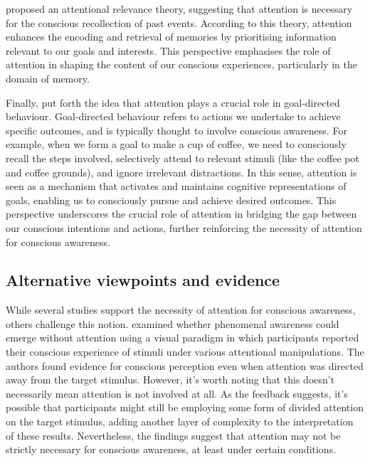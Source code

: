 \documentclass[10pt]{article}
\begin{document}
\begin{sloppypar}
  \cite{de_brigard_role_2012} proposed an attentional relevance theory, suggesting that attention is necessary for the conscious recollection of past events. According to this theory, attention enhances the encoding and retrieval of memories by prioritising information relevant to our goals and interests. This perspective emphasises the role of attention in shaping the content of our conscious experiences, particularly in the domain of memory.

  Finally, \cite{dijksterhuis_goals_2010} put forth the idea that attention plays a crucial role in goal-directed behaviour. Goal-directed behaviour refers to actions we undertake to achieve specific outcomes, and is typically thought to involve conscious awareness. For example, when we form a goal to make a cup of coffee, we need to consciously recall the steps involved, selectively attend to relevant stimuli (like the coffee pot and coffee grounds), and ignore irrelevant distractions. In this sense, attention is seen as a mechanism that activates and maintains cognitive representations of goals, enabling us to consciously pursue and achieve desired outcomes. This perspective underscores the crucial role of attention in bridging the gap between our conscious intentions and actions, further reinforcing the necessity of attention for conscious awareness.


  \subsection{Alternative viewpoints and evidence}
  \label{sec:alternative}

  While several studies support the necessity of attention for conscious awareness, others challenge this notion. \cite{aru_phenomenal_2013} examined whether phenomenal awareness could emerge without attention using a visual paradigm in which participants reported their conscious experience of stimuli under various attentional manipulations. The authors found evidence for conscious perception even when attention was directed away from the target stimulus. However, it's worth noting that this doesn't necessarily mean attention is not involved at all. As the feedback suggests, it's possible that participants might still be employing some form of divided attention on the target stimulus, adding another layer of complexity to the interpretation of these results. Nevertheless, the findings suggest that attention may not be strictly necessary for conscious awareness, at least under certain conditions.


\end{sloppypar}
\end{document}
